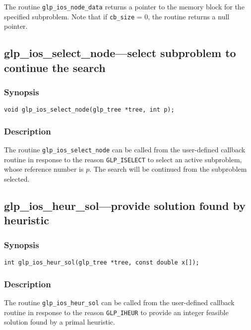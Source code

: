 The routine \verb|glp_ios_node_data| returns a pointer to the memory
block for the specified subproblem. Note that if \verb|cb_size| = 0, the
routine returns a null pointer.

\subsection{glp\_ios\_select\_node---select subproblem to continue
the search}

\subsubsection*{Synopsis}

\begin{verbatim}
void glp_ios_select_node(glp_tree *tree, int p);
\end{verbatim}

\subsubsection*{Description}

The routine \verb|glp_ios_select_node| can be called from the
user-defined callback routine in response to the reason
\verb|GLP_ISELECT| to select an active subproblem, whose reference
number is $p$. The search will be continued from the subproblem
selected.

\newpage

\subsection{glp\_ios\_heur\_sol---provide solution found by heuristic}

\subsubsection*{Synopsis}

\begin{verbatim}
int glp_ios_heur_sol(glp_tree *tree, const double x[]);
\end{verbatim}

\subsubsection*{Description}

The routine \verb|glp_ios_heur_sol| can be called from the user-defined
callback routine in response to the reason \verb|GLP_IHEUR| to provide
an integer feasible solution found by a primal heuristic.


